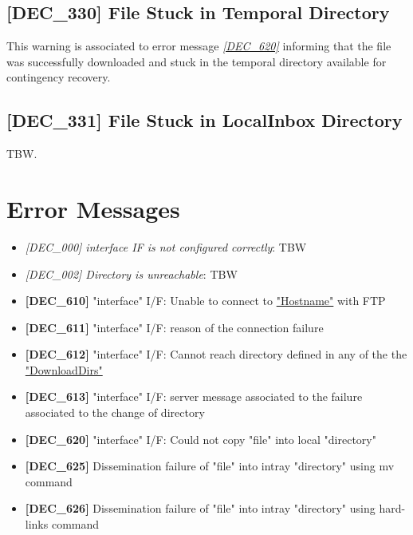 \documentclass[dec_sum_main.tex]{subfiles}
\begin{document}
\subsection{[DEC\_330] File Stuck in Temporal Directory}
This warning is associated to error message \hyperref[DEC620]{\textit{[DEC\_620]}} informing that the file was successfully downloaded and stuck in the temporal directory available for contingency recovery.

\subsection{[DEC\_331] File Stuck in LocalInbox Directory}
TBW.



\section{Error Messages}

\begin{itemize}
	\item \textit{[DEC\_000] \textit{interface} I\/F is not configured correctly}: TBW
	\item \textit{[DEC\_002] Directory is unreachable}: TBW
	\item \textbf{[DEC\_610]} "interface" I/F: Unable to connect to \hyperref[Config_Server]{"Hostname"} with FTP
	\item \textbf{[DEC\_611]} "interface" I/F: reason of the connection failure
	\item \textbf{[DEC\_612]} "interface" I/F: Cannot reach directory defined in any of the the \hyperref[DownloadDirs]{"DownloadDirs"}
	\item \textbf{[DEC\_613]} "interface" I/F: server message associated to the failure associated to the change of directory
	\item \textbf{[DEC\_620]} "interface" I/F: Could not copy "file" into local
"directory"
	\item \textbf{[DEC\_625]} Dissemination failure of "file" into intray
"directory" using mv command
	\item \textbf{[DEC\_626]} Dissemination failure of "file" into intray
"directory" using hard-links command
\end{itemize}
\end{document}
